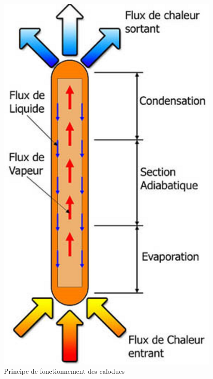 \documentclass[../PS6_RapportFinal.tex]{subfiles}
\begin{document}
\begin{figure}[!h]
\begin{center}
\includegraphics[scale=0.1]{3_1_caloduc.JPG}
\caption{Principe de fonctionnement des caloducs}
\end{center}
\end{figure}

	
\end{document}

